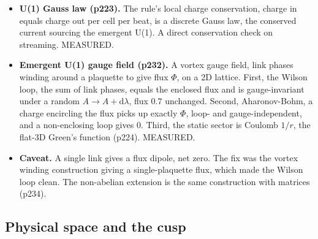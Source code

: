 \begin{itemize}
  \item \textbf{U(1) Gauss law (p223).} The rule's local charge conservation, charge in equals charge out per cell
  per beat, is a discrete Gauss law, the conserved current sourcing the emergent U(1). A direct conservation check
  on streaming. MEASURED.
  \item \textbf{Emergent U(1) gauge field (p232).} A vortex gauge field, link phases winding around a plaquette to
  give flux $\Phi$, on a 2D lattice. First, the Wilson loop, the sum of link phases, equals the enclosed flux and
  is gauge-invariant under a random $A \to A + \mathrm{d}\lambda$, flux $0.7$ unchanged. Second, Aharonov-Bohm, a
  charge encircling the flux picks up exactly $\Phi$, loop- and gauge-independent, and a non-enclosing loop gives
  $0$. Third, the static sector is Coulomb $1/r$, the flat-3D Green's function (p224). MEASURED.
  \item \textbf{Caveat.} A single link gives a flux dipole, net zero. The fix was the vortex winding construction
  giving a single-plaquette flux, which made the Wilson loop clean. The non-abelian extension is the same
  construction with matrices (p234).
\end{itemize}

\subsection{Physical space and the cusp}


